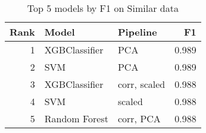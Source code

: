 \begin{table}[!htb]
\centering
\begin{tabular}{rllr}
\toprule
Rank & Model & Pipeline & F1 \\
\midrule
1 & XGBClassifier & PCA & 0.989 \\
2 & SVM & PCA & 0.989 \\
3 & XGBClassifier & corr, scaled & 0.988 \\
4 & SVM & scaled & 0.988 \\
5 & Random Forest & corr, PCA & 0.988 \\
\bottomrule
\end{tabular}
\caption{Top 5 models by F1 on Similar data}
\label{table-top-5-f1-similar}
\end{table}
